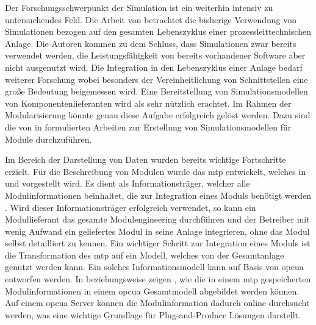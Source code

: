 Der Forschungsschwerpunkt der Simulation ist ein weiterhin intensiv zu untersuchendes Feld. Die Arbeit  von \citeauthor{Oppelt_2015} betrachtet die bisherige Verwendung von Simulationen bezogen auf den gesamten Lebenszyklus einer prozessleittechnischen Anlage. Die Autoren kommen zu dem Schluss, dass Simulationen zwar bereits verwendet werden, die Leistungsf\"ahigkeit von bereits vorhandener Software aber nicht ausgenutzt wird. Die Integration in den Lebenszyklus einer Anlage bedarf weiterer Forschung wobei besonders der Vereinheitlichung von Schnittstellen eine gro\ss{}e Bedeutung beigemessen wird. Eine Bereitstellung von Simulationsmodellen von Komponentenlieferanten wird als sehr n\"utzlich erachtet. \cite{Oppelt_2015} Im Rahmen der Modularisierung k\"onnte genau diese Aufgabe erfolgreich gel\"ost werden. Dazu sind die von \citeauthor{Bramsiepe_2012} in \cite{Bramsiepe_2012} formulierten Arbeiten zur Erstellung von Simulationsmodellen f\"ur Module durchzuf\"uhren. 

Im Bereich der Darstellung von Daten wurden bereits wichtige Fortschritte erzielt. 
F\"ur die Beschreibung von Modulen wurde das \ac{mtp} entwickelt, welches in \cite{Obst_2015} und \cite{Obst_2015a} vorgestellt wird. Es dient als Informationstr\"ager, welcher alle Modulinformationen beinhaltet, die zur Integration eines Moduls ben\"otigt werden \cite[S. 2]{Obst_2015}. Wird dieser Informationstr\"ager erfolgreich verwendet, so kann ein Modullieferant das gesamte Modulengineering durchf\"uhren und der Betreiber mit wenig Aufwand ein geliefertes Modul in seine Anlage integrieren, ohne das Modul selbst detailliert zu kennen. Ein wichtiger Schritt zur Integration eines Moduls ist die Transformation des \ac{mtp} auf ein Modell, welches von der Gesamtanlage genutzt werden kann. Ein solches Informationsmodell kann auf Basis von \ac{opcua} entworfen werden. In \cite{Wassilew_2016} beziehungsweise \cite{Wassilew_2017} zeigen \citeauthor{Wassilew_2016}, wie die in einem \ac{mtp} gespeicherten Modulinformationen in einem \ac{opcua} Gesamtmodell abgebildet werden k\"onnen. Auf einem \ac{opcua} Server k\"onnen die Modulinformation dadurch online durchsucht werden, was eine wichtige Grundlage f\"ur Plug-and-Produce L\"osungen darstellt. 

